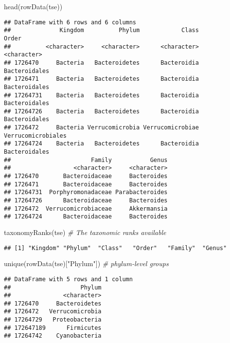 \documentclass[
  oneside]{book}
\newenvironment{Shaded}{\begin{snugshade}}{\end{snugshade}}
\newcommand{\CommentTok}[1]{\textcolor[rgb]{0.56,0.35,0.01}{\textit{#1}}}
\newcommand{\FunctionTok}[1]{\textcolor[rgb]{0.00,0.00,0.00}{#1}}
\newcommand{\NormalTok}[1]{#1}
\newcommand{\StringTok}[1]{\textcolor[rgb]{0.31,0.60,0.02}{#1}}
\begin{document}
\begin{Shaded}
\begin{Highlighting}[]
\FunctionTok{head}\NormalTok{(}\FunctionTok{rowData}\NormalTok{(tse))}
\end{Highlighting}
\end{Shaded}

\begin{verbatim}
## DataFrame with 6 rows and 6 columns
##              Kingdom          Phylum            Class              Order
##          <character>     <character>      <character>        <character>
## 1726470     Bacteria   Bacteroidetes      Bacteroidia      Bacteroidales
## 1726471     Bacteria   Bacteroidetes      Bacteroidia      Bacteroidales
## 17264731    Bacteria   Bacteroidetes      Bacteroidia      Bacteroidales
## 17264726    Bacteria   Bacteroidetes      Bacteroidia      Bacteroidales
## 1726472     Bacteria Verrucomicrobia Verrucomicrobiae Verrucomicrobiales
## 17264724    Bacteria   Bacteroidetes      Bacteroidia      Bacteroidales
##                       Family           Genus
##                  <character>     <character>
## 1726470       Bacteroidaceae     Bacteroides
## 1726471       Bacteroidaceae     Bacteroides
## 17264731  Porphyromonadaceae Parabacteroides
## 17264726      Bacteroidaceae     Bacteroides
## 1726472  Verrucomicrobiaceae     Akkermansia
## 17264724      Bacteroidaceae     Bacteroides
\end{verbatim}

\begin{Shaded}
\begin{Highlighting}[]
\FunctionTok{taxonomyRanks}\NormalTok{(tse) }\CommentTok{\# The taxonomic ranks available}
\end{Highlighting}
\end{Shaded}

\begin{verbatim}
## [1] "Kingdom" "Phylum"  "Class"   "Order"   "Family"  "Genus"
\end{verbatim}

\begin{Shaded}
\begin{Highlighting}[]
\FunctionTok{unique}\NormalTok{(}\FunctionTok{rowData}\NormalTok{(tse)[}\StringTok{"Phylum"}\NormalTok{]) }\CommentTok{\# phylum{-}level groups}
\end{Highlighting}
\end{Shaded}

\begin{verbatim}
## DataFrame with 5 rows and 1 column
##                    Phylum
##               <character>
## 1726470     Bacteroidetes
## 1726472   Verrucomicrobia
## 17264729   Proteobacteria
## 172647189      Firmicutes
## 17264742    Cyanobacteria
\end{verbatim}
\end{document}
